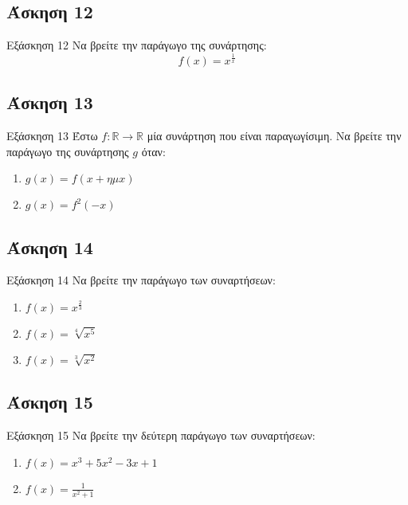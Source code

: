 \documentclass[greek]{beamer}
\begin{document}
\subsection{Άσκηση 12}
\begin{frame}[label=Άσκηση12]{Εξάσκηση 12}
 Να βρείτε την παράγωγο της συνάρτησης:
 $$f(x)=x^{\frac{1}{x}}$$

\end{frame}

\subsection{Άσκηση 13}
\begin{frame}[label=Άσκηση13]{Εξάσκηση 13}
 Έστω $f:\mathbb{R}\to\mathbb{R}$ μία συνάρτηση που είναι παραγωγίσιμη. Να βρείτε την παράγωγο της συνάρτησης $g$ όταν:
 \begin{enumerate}
  \item<1-> $g(x)=f(x+ημx)$
  \item<2-> $g(x)=f^2(-x)$
 \end{enumerate}

\end{frame}

\subsection{Άσκηση 14}
\begin{frame}[label=Άσκηση14]{Εξάσκηση 14}
 Να βρείτε την παράγωγο των συναρτήσεων:
 \begin{enumerate}
  \item<1-> $f(x)=x^{\frac{2}{3}}$
  \item<2-> $f(x)=\sqrt[4]{x^5}$
  \item<3-> $f(x)=\sqrt[3]{x^2}$
 \end{enumerate}

\end{frame}

\subsection{Άσκηση 15}
\begin{frame}[label=Άσκηση15]{Εξάσκηση 15}
 Να βρείτε την δεύτερη παράγωγο των συναρτήσεων:
 \begin{enumerate}
  \item<1-> $f(x)=x^3+5x^2-3x+1$
  \item<2-> $f(x)=\frac{1}{x^2+1}$
 \end{enumerate}

\end{frame}
\end{document}
